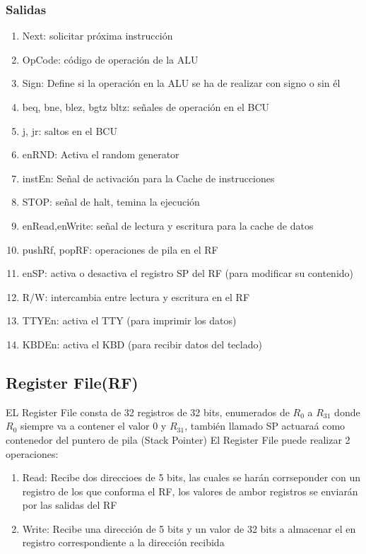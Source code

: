 \documentclass{article}
\begin{document}
            \subsubsection{Salidas}
            \begin{enumerate}
                \item Next: solicitar pr\'oxima instrucci\'on
                \item OpCode: c\'odigo de operaci\'on de la ALU
                \item Sign: Define si la operaci\'on en la ALU se ha de realizar con signo o sin \'el
                \item beq, bne, blez, bgtz bltz: se\~nales de operaci\'on en el BCU
                \item j, jr: saltos en el BCU
                \item enRND: Activa el random generator
                \item instEn: Se\~nal de activaci\'on para la Cache de instrucciones
                \item STOP: se\~nal de halt, temina la ejecuci\'on
                \item enRead,enWrite: se\~nal de lectura y escritura para la cache de datos
                \item pushRf, popRF: operaciones de pila en el RF
                \item enSP: activa o desactiva el registro SP del RF (para modificar su contenido)
                \item R/W: intercambia entre lectura y escritura en el RF
                \item TTYEn: activa el TTY (para imprimir los datos)
                \item KBDEn: activa el KBD (para recibir datos del teclado)
            \end{enumerate}

        \subsection{Register File(RF)}
        \label{sec:RF}       
            EL Register File consta de 32 registros de 32 bits, enumerados de $R_{0}$ a $R_{31}$
            donde $R_0$ siempre va a contener el valor 0 y $R_{31}$, tambi\'en llamado SP actuara\'a como contenedor del puntero de pila (Stack Pointer)
            El Register File puede realizar 2 operaciones:
            
            \begin{enumerate}
                \item Read: Recibe dos direccioes de 5 bits, las cuales se har\'an corrseponder con un registro de los que conforma el RF, los valores de ambor registros se enviar\'an por las salidas del RF
                \item Write: Recibe una direcci\'on de 5 bits y un valor de 32 bits a almacenar el en registro correspondiente a la direcci\'on recibida
            \end{enumerate}
            
\end{document}
